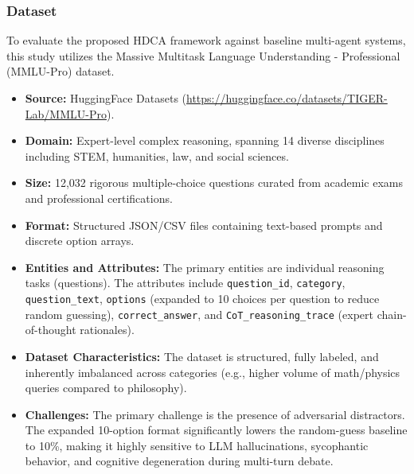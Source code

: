 \documentclass[a4paper,fleqn]{cas-sc}
\begin{document}
\subsubsection{Dataset}
To evaluate the proposed HDCA framework against baseline multi-agent systems, this study utilizes the Massive Multitask Language Understanding - Professional (MMLU-Pro) dataset.
\begin{itemize}
    \item \textbf{Source:} HuggingFace Datasets (\url{https://huggingface.co/datasets/TIGER-Lab/MMLU-Pro}).
    \item \textbf{Domain:} Expert-level complex reasoning, spanning 14 diverse disciplines including STEM, humanities, law, and social sciences.
    \item \textbf{Size:} 12,032 rigorous multiple-choice questions curated from academic exams and professional certifications.
    \item \textbf{Format:} Structured JSON/CSV files containing text-based prompts and discrete option arrays.
    \item \textbf{Entities and Attributes:} The primary entities are individual reasoning tasks (questions). The attributes include \texttt{question\_id}, \texttt{category}, \texttt{question\_text}, \texttt{options} (expanded to 10 choices per question to reduce random guessing), \texttt{correct\_answer}, and \texttt{CoT\_reasoning\_trace} (expert chain-of-thought rationales).
    \item \textbf{Dataset Characteristics:} The dataset is structured, fully labeled, and inherently imbalanced across categories (e.g., higher volume of math/physics queries compared to philosophy).
    \item \textbf{Challenges:} The primary challenge is the presence of adversarial distractors. The expanded 10-option format significantly lowers the random-guess baseline to 10\%, making it highly sensitive to LLM hallucinations, sycophantic behavior, and cognitive degeneration during multi-turn debate.
\end{itemize}
\end{document}
